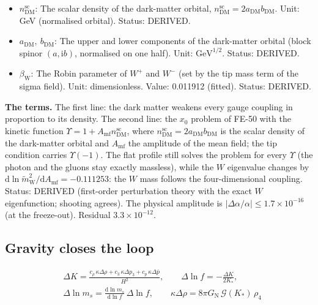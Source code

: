 \documentclass[
  10pt,
]{article}
\begin{document}
\begin{itemize}
  \(x_0\) problem of the gauge fields (a bookkeeping parameter: the
  result is linear in it). Unit: \(\mathrm{GeV}^{-1}\) (with the orbital
  normalisation). Status: DERIVED.
\item
  \(n^{\mathrm{sc}}_{\mathrm{DM}}\): The scalar density of the
  dark-matter orbital,
  \(n^{\mathrm{sc}}_{\mathrm{DM}} = 2a_{\mathrm{DM}}b_{\mathrm{DM}}\).
  Unit: GeV (normalised orbital). Status: DERIVED.
\item
  \(a_{\mathrm{DM}},\ b_{\mathrm{DM}}\): The upper and lower components
  of the dark-matter orbital (block spinor \((a, \mathrm{i}b)\),
  normalised on one half). Unit: \(\mathrm{GeV}^{1/2}\). Status:
  DERIVED.
\item
  \(\beta_{\mathrm{W}}\): The Robin parameter of \(W^+\) and \(W^-\)
  (set by the tip mass term of the sigma field). Unit: dimensionless.
  Value: 0.011912 (fitted). Status: DERIVED.
\end{itemize}

\textbf{The terms.} The first line: the dark matter weakens every gauge
coupling in proportion to its density. The second line: the \(x_0\)
problem of FE-50 with the kinetic function
\(\Upsilon = 1 + A_{\mathrm{mf}}n^{\mathrm{sc}}_{\mathrm{DM}}\), where
\(n^{\mathrm{sc}}_{\mathrm{DM}} = 2a_{\mathrm{DM}}b_{\mathrm{DM}}\) is
the scalar density of the dark-matter orbital and \(A_{\mathrm{mf}}\)
the amplitude of the mean field; the tip condition carries
\(\Upsilon(-1)\). The flat profile still solves the problem for every
\(\Upsilon\) (the photon and the gluons stay exactly massless), while
the \(W\) eigenvalue changes by
\(\mathrm{d}\ln\tilde m_{\mathrm{W}}^2/\mathrm{d}A_{\mathrm{mf}} = -0.111253\):
the \(W\) mass follows the four-dimensional coupling. Status: DERIVED
(first-order perturbation theory with the exact \(W\) eigenfunction;
shooting agrees). The physical amplitude is
\(\lvert\Delta\alpha/\alpha\rvert \le 1.7\times10^{-16}\) (at the
freeze-out). Residual \(3.3\times10^{-12}\).

\hypertarget{gravity-closes-the-loop}{%
\subsection{Gravity closes the loop}\label{gravity-closes-the-loop}}

\[
\begin{aligned}
&\Delta K = \frac{c_\rho\,\kappa\Delta\rho + c_3\,\kappa\Delta p_3 + c_p\,\kappa\Delta\bar p}{H^2},\qquad
 \Delta\ln f = -\frac{\Delta K}{2K_*},\\
&\Delta\ln m_s = \frac{\mathrm{d}\ln m_s}{\mathrm{d}\ln f}\,\Delta\ln f,\qquad
 \kappa\Delta\rho = 8\pi G_{\mathrm{N}}\,\mathcal{G}(K_*)\,\rho_4
\end{aligned} \tag{FE-80}
\]
\end{document}
